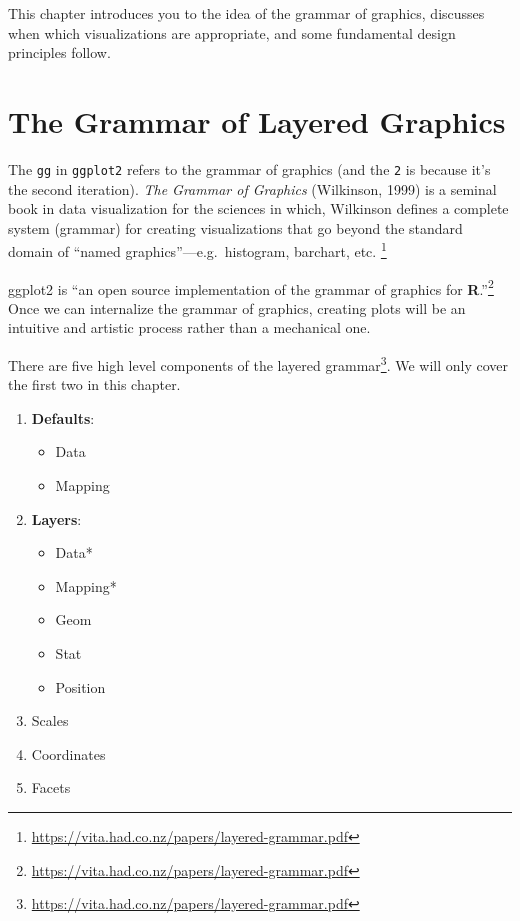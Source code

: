 \documentclass[
]{book}
\providecommand{\tightlist}{%
  \setlength{\itemsep}{0pt}\setlength{\parskip}{0pt}}
\begin{document}
This chapter introduces you to the idea of the grammar of graphics, discusses when which visualizations are appropriate, and some fundamental design principles follow.

\hypertarget{the-grammar-of-layered-graphics}{%
\section{The Grammar of Layered Graphics}\label{the-grammar-of-layered-graphics}}

The \texttt{gg} in \texttt{ggplot2} refers to the grammar of graphics (and the \texttt{2} is because it's the second iteration). \emph{The Grammar of Graphics} (Wilkinson, 1999) is a seminal book in data visualization for the sciences in which, Wilkinson defines a complete system (grammar) for creating visualizations that go beyond the standard domain of ``named graphics''---e.g.~histogram, barchart, etc. \footnote{\url{https://vita.had.co.nz/papers/layered-grammar.pdf}}

ggplot2 is ``an open source implementation of the grammar of graphics for \textbf{R}.''\footnote{\url{https://vita.had.co.nz/papers/layered-grammar.pdf}} Once we can internalize the grammar of graphics, creating plots will be an intuitive and artistic process rather than a mechanical one.

There are five high level components of the layered grammar\footnote{\url{https://vita.had.co.nz/papers/layered-grammar.pdf}}. We will only cover the first two in this chapter.

\begin{enumerate}
\def\labelenumi{\arabic{enumi}.}
\tightlist
\item
  \textbf{Defaults}:

  \begin{itemize}
  \tightlist
  \item
    Data
  \item
    Mapping
  \end{itemize}
\item
  \textbf{Layers}:

  \begin{itemize}
  \tightlist
  \item
    Data*
  \item
    Mapping*
  \item
    Geom
  \item
    Stat
  \item
    Position
  \end{itemize}
\item
  Scales
\item
  Coordinates
\item
  Facets
\end{enumerate}
\end{document}
